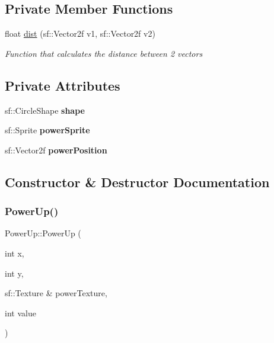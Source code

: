 \subsection*{Private Member Functions}
\begin{DoxyCompactItemize}
\item 
float \mbox{\hyperlink{class_power_up_ae75ce5b30344277ed04c831cf49d5f7b}{dist}} (sf\+::\+Vector2f v1, sf\+::\+Vector2f v2)
\begin{DoxyCompactList}\small\item\em Function that calculates the distance between 2 vectors \end{DoxyCompactList}\end{DoxyCompactItemize}
\subsection*{Private Attributes}
\begin{DoxyCompactItemize}
\item 
\mbox{\label{class_power_up_a8d93490d2a4e5917d89ec45c2ee2586b}} 
sf\+::\+Circle\+Shape {\bfseries shape}
\item 
\mbox{\label{class_power_up_a34ffe63204b3533994ad6bd696011e43}} 
sf\+::\+Sprite {\bfseries power\+Sprite}
\item 
\mbox{\label{class_power_up_a888b24bd35602ffe5f2b36e52d096201}} 
sf\+::\+Vector2f {\bfseries power\+Position}
\end{DoxyCompactItemize}


\subsection{Constructor \& Destructor Documentation}
\mbox{\label{class_power_up_adcc7af6ff5706a8d599b9d2f2f01310b}} 
\subsubsection{\texorpdfstring{PowerUp()}{PowerUp()}}
{\footnotesize\ttfamily Power\+Up\+::\+Power\+Up (\begin{DoxyParamCaption}\item[{int}]{x,  }\item[{int}]{y,  }\item[{sf\+::\+Texture \&}]{power\+Texture,  }\item[{int}]{value }\end{DoxyParamCaption})}



